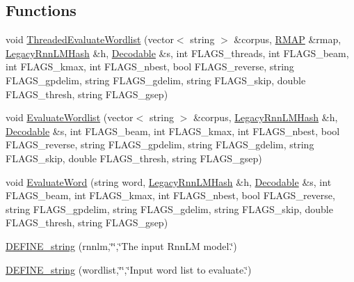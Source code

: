 \subsection*{Functions}
\begin{DoxyCompactItemize}
\item 
void \hyperlink{phonetisaurus-g2prnn_8cc_aeda911220d69a88fc9cca5b1f3d870d7}{Threaded\+Evaluate\+Wordlist} (vector$<$ string $>$ \&corpus, \hyperlink{phonetisaurus-g2pfst_8cc_aaed81f2ee40857c2b37f7772067c38ee}{R\+M\+AP} \&rmap, \hyperlink{class_legacy_rnn_l_m_hash}{Legacy\+Rnn\+L\+M\+Hash} \&h, \hyperlink{phonetisaurus-g2prnn_8cc_a43ce4eb8f370c5b37f80c5bb5f1b4e16}{Decodable} \&s, int F\+L\+A\+G\+S\+\_\+threads, int F\+L\+A\+G\+S\+\_\+beam, int F\+L\+A\+G\+S\+\_\+kmax, int F\+L\+A\+G\+S\+\_\+nbest, bool F\+L\+A\+G\+S\+\_\+reverse, string F\+L\+A\+G\+S\+\_\+gpdelim, string F\+L\+A\+G\+S\+\_\+gdelim, string F\+L\+A\+G\+S\+\_\+skip, double F\+L\+A\+G\+S\+\_\+thresh, string F\+L\+A\+G\+S\+\_\+gsep)
\item 
void \hyperlink{phonetisaurus-g2prnn_8cc_a5209b9ab2d29f2b5dd99d644dd339969}{Evaluate\+Wordlist} (vector$<$ string $>$ \&corpus, \hyperlink{class_legacy_rnn_l_m_hash}{Legacy\+Rnn\+L\+M\+Hash} \&h, \hyperlink{phonetisaurus-g2prnn_8cc_a43ce4eb8f370c5b37f80c5bb5f1b4e16}{Decodable} \&s, int F\+L\+A\+G\+S\+\_\+beam, int F\+L\+A\+G\+S\+\_\+kmax, int F\+L\+A\+G\+S\+\_\+nbest, bool F\+L\+A\+G\+S\+\_\+reverse, string F\+L\+A\+G\+S\+\_\+gpdelim, string F\+L\+A\+G\+S\+\_\+gdelim, string F\+L\+A\+G\+S\+\_\+skip, double F\+L\+A\+G\+S\+\_\+thresh, string F\+L\+A\+G\+S\+\_\+gsep)
\item 
void \hyperlink{phonetisaurus-g2prnn_8cc_aa3699879f92e8e27fdfbce625ba21ac2}{Evaluate\+Word} (string word, \hyperlink{class_legacy_rnn_l_m_hash}{Legacy\+Rnn\+L\+M\+Hash} \&h, \hyperlink{phonetisaurus-g2prnn_8cc_a43ce4eb8f370c5b37f80c5bb5f1b4e16}{Decodable} \&s, int F\+L\+A\+G\+S\+\_\+beam, int F\+L\+A\+G\+S\+\_\+kmax, int F\+L\+A\+G\+S\+\_\+nbest, bool F\+L\+A\+G\+S\+\_\+reverse, string F\+L\+A\+G\+S\+\_\+gpdelim, string F\+L\+A\+G\+S\+\_\+gdelim, string F\+L\+A\+G\+S\+\_\+skip, double F\+L\+A\+G\+S\+\_\+thresh, string F\+L\+A\+G\+S\+\_\+gsep)
\item 
\hyperlink{phonetisaurus-g2prnn_8cc_a4d6c8868221908bdaac95aeb694bf7d2}{D\+E\+F\+I\+N\+E\+\_\+string} (rnnlm,\char`\"{}\char`\"{},\char`\"{}The input Rnn\+LM model.\char`\"{})
\item 
\hyperlink{phonetisaurus-g2prnn_8cc_a74b564a3305ef7fab8247f5cdfca26c9}{D\+E\+F\+I\+N\+E\+\_\+string} (wordlist,\char`\"{}\char`\"{},\char`\"{}Input word list to evaluate.\char`\"{})

\end{DoxyCompactItemize}
